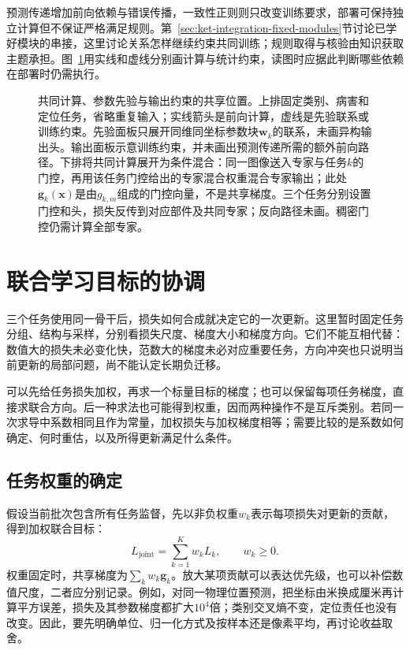 预测传递增加前向依赖与错误传播，一致性正则则只改变训练要求，部署可保持独立计算但不保证严格满足规则。第~\ref{sec:ket-integration-fixed-modules}节讨论已学好模块的串接，这里讨论关系怎样继续约束共同训练；规则取得与核验由知识获取主题承担。图~\ref{fig:ket-sharing-locations}用实线和虚线分别画计算与统计约束，读图时应据此判断哪些依赖在部署时仍需执行。

\begin{figure}[htbp]
  \centering
  
  \caption{共同计算、参数先验与输出约束的共享位置。上排固定类别、病害和定位任务，省略重复输入；实线箭头是前向计算，虚线是先验联系或训练约束。先验面板只展开同维同坐标参数块$\bm w_k$的联系，未画异构输出头。输出面板示意训练约束，并未画出预测传递所需的额外前向路径。下排将共同计算展开为条件混合：同一图像送入专家与任务$k$的门控，再用该任务门控给出的专家混合权重混合专家输出；此处$\bm g_k(\bm x)$是由$g_{k,m}$组成的门控向量，不是共享梯度。三个任务分别设置门控和头，损失反传到对应部件及共同专家；反向路径未画。稠密门控仍需计算全部专家。}
  \label{fig:ket-sharing-locations}
\end{figure}
\FloatBarrier

\section{联合学习目标的协调}
\label{sec:ket-sharing-objectives}

三个任务使用同一骨干后，损失如何合成就决定它的一次更新。这里暂时固定任务分组、结构与采样，分别看损失尺度、梯度大小和梯度方向。它们不能互相代替：数值大的损失未必变化快，范数大的梯度未必对应重要任务，方向冲突也只说明当前更新的局部问题，尚不能认定长期负迁移。

可以先给任务损失加权，再求一个标量目标的梯度；也可以保留每项任务梯度，直接求联合方向。后一种求法也可能得到权重，因而两种操作不是互斥类别。若同一次求导中系数相同且作为常量，加权损失与加权梯度相等；需要比较的是系数如何确定、何时重估，以及所得更新满足什么条件。

\subsection{任务权重的确定}
\label{sec:ket-sharing-weights}

假设当前批次包含所有任务监督，先以非负权重$w_k$表示每项损失对更新的贡献，得到加权联合目标：
\begin{equation}
  L_{\mathrm{joint}}
  =\sum_{k=1}^{K}w_kL_k,
  \qquad w_k\geq0.
  \label{eq:ket-sharing-weighted-loss}
\end{equation}
权重固定时，共享梯度为$\sum_k w_k\bm g_k$。放大某项贡献可以表达优先级，也可以补偿数值尺度，二者应分别记录。例如，对同一物理位置预测，把坐标由米换成厘米再计算平方误差，损失及其参数梯度都扩大$10^4$倍；类别交叉熵不变，定位责任也没有改变。因此，要先明确单位、归一化方式及按样本还是像素平均，再讨论收益取舍。

